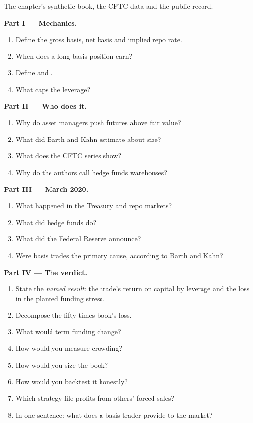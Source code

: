 \begin{problem}\label{pb:s2:the-bond-futures-basis-trade:1}
The chapter's synthetic book, the CFTC data and the public record.

\medskip\noindent\textbf{Part I --- Mechanics.}
\begin{enumerate}
\item Define the gross basis, net basis and implied repo rate.
\item When does a long basis position earn?
\item Define  and .
\item What caps the leverage?
\end{enumerate}

\medskip\noindent\textbf{Part II --- Who does it.}
\begin{enumerate}[resume]
\item Why do asset managers push futures above fair value?
\item What did Barth and Kahn estimate about size?
\item What does the CFTC series show?
\item Why do the authors call hedge funds warehouses?
\end{enumerate}

\medskip\noindent\textbf{Part III --- March 2020.}
\begin{enumerate}[resume]
\item What happened in the Treasury and repo markets?
\item What did hedge funds do?
\item What did the Federal Reserve announce?
\item Were basis trades the primary cause, according to Barth and Kahn?
\end{enumerate}

\medskip\noindent\textbf{Part IV --- The verdict.}
\begin{enumerate}[resume]
\item State the \emph{named result}: the trade's return on capital by leverage and the loss in the planted funding stress.
\item Decompose the fifty-times book's loss.
\item What would term funding change?
\item How would you measure crowding?
\item How would you size the book?
\item How would you backtest it honestly?
\item Which strategy file profits from others' forced sales?
\item In one sentence: what does a basis trader provide to the market?
\end{enumerate}
\end{problem}

